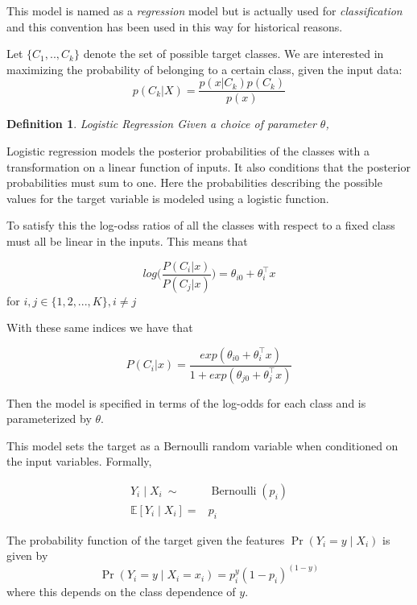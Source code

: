 \documentclass{article}%
\newtheorem{definition}{Definition}[subsection]
\theoremstyle{definition}
\begin{document}
This model is named as a \textit{regression} model but is actually used for \textit{classification} and this convention has been used in this way for historical reasons.



Let $\{C_1,..,C_k\}$ denote the set of possible target classes. We are  interested in maximizing the probability of belonging to a certain class, given the input data:
$$p(C_k| X) = \frac{p(x|C_k)p(C_k)}{p(x)} $$

\begin{definition}{Logistic Regression}
	Given a choice of parameter $\theta$, 	
\end{definition}

Logistic regression models the posterior probabilities of the classes with a transformation on a linear function of inputs. It also conditions that the posterior probabilities must sum to one. Here the probabilities describing the possible values for the target variable is modeled using a logistic function.

To satisfy this the log-odss ratios of all the classes with respect to a fixed class must all be linear in the inputs. This means that

$$ log\big( \frac{P(C_i|x)}{P(C_j|x)}\big) = \theta_{i0}  + \theta_i^\intercal x  $$ for $i,j \in \{1,2,...,K\}, i\neq j$ \label{logit-logOddss}

With these same indices we have that

$$ P(C_i|x) = \frac{ exp(\theta_{i0}  + \theta_i^\intercal x)}{1 + exp(\theta_{j0}  + \theta_j^\intercal x)}   $$ 

Then the model is specified in terms of the log-odds for each class and is parameterized by $\theta$.

This model sets the target as a Bernoulli random variable when conditioned on the input variables. Formally,

\begin{equation}
\begin{split}
Y_i \mid X_i \  \sim & \operatorname{Bernoulli}(p_i) \\
\mathbb{E}[Y_i \mid X_i ] = & p_i  
\end{split}
\end{equation}


The probability function of the target given the features $\Pr(Y_i=y\mid X_i)$ is given by 
$$\Pr(Y_i=y \mid X_i = x_i) = p_i^{y} (1-p_i)^{(1-y)}$$\label{logit-probabilityDensity}
where this depends on the class dependence of $y$.
\end{document}
